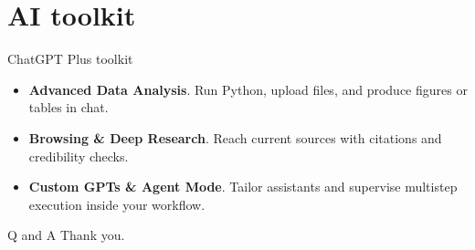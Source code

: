 \documentclass[aspectratio=169,professionalfonts]{beamer}
\newcommand{\feature}[1]{\textbf{#1}}
\begin{document}
\section{AI toolkit}

\begin{frame}{ChatGPT Plus toolkit}
  \begin{itemize}
    \item \feature{Advanced Data Analysis}. Run Python, upload files, and produce figures or tables in chat.
    \item \feature{Browsing \& Deep Research}. Reach current sources with citations and credibility checks.
    \item \feature{Custom GPTs \& Agent Mode}. Tailor assistants and supervise multistep execution inside your workflow.
  \end{itemize}
\end{frame}

\begin{frame}{Q and A}
  \centering Thank you.
\end{frame}
\end{document}
